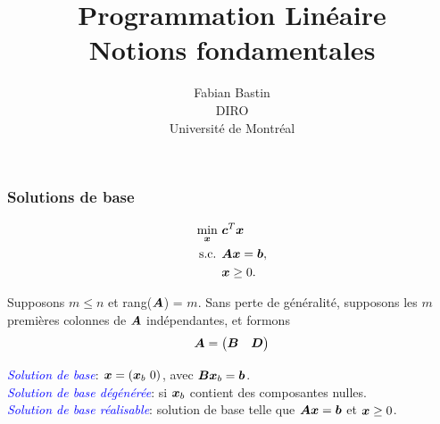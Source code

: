 \documentclass[usepdftitle=false]{beamer}
\title[Notions fondamentales]{Programmation Linéaire\\Notions fondamentales}
\author[Fabian Bastin]{Fabian Bastin\\DIRO\\Université de Montréal}
\date{}
\begin{document}
\frame{\titlepage}

\begin{frame}


\frametitle{Solutions de base}

\begin{align*}
\min_{{\boldsymbol{x}}}\ & {\boldsymbol{c}}^T {\boldsymbol{x}} \\
\mbox{s.c. } & {\boldsymbol{A}} {\boldsymbol{x}} = {\boldsymbol{b}}, \\
 & {\boldsymbol{x}} \geq 0.
\end{align*}

\mbox{}

Supposons $m \leq n$ et rang(${\boldsymbol{A}}$) = $m$.
Sans perte de généralité, supposons les $m$ premières colonnes de ${\boldsymbol{A}}$ indépendantes, et formons
\[
{\boldsymbol{A}} =
\begin{pmatrix}
 {\boldsymbol{B}} & {\boldsymbol{D}}
\end{pmatrix}
\]

\mbox{}

{\it \textcolor{blue}{Solution de base}}: $\bsx = (\bsx_b \ 0)$, avec ${\boldsymbol{B}}{\boldsymbol{x}}_b = {\boldsymbol{b}}$.\\
{\it \textcolor{blue}{Solution de base dégénérée}}: si ${\boldsymbol{x}}_b$ contient des composantes nulles. \\
{\it \textcolor{blue}{Solution de base réalisable}}: solution de base telle que ${\boldsymbol{A}}{\boldsymbol{x}} = {\boldsymbol{b}}$ et ${\boldsymbol{x}} \geq 0$.
\end{frame}
\end{document}
